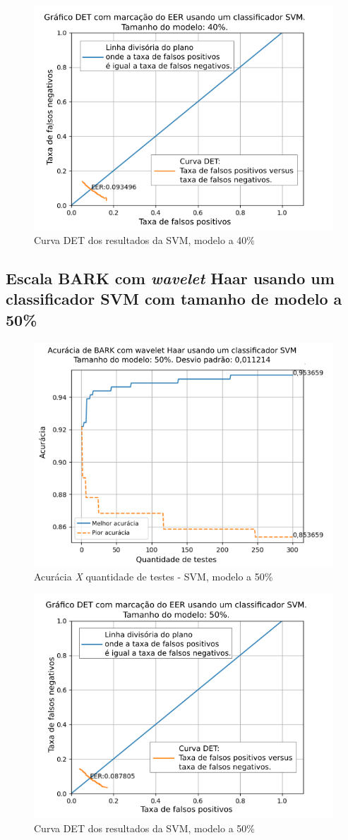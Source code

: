 			\begin{figure}[!h]
				\centering
				\includegraphics[width=.6\linewidth]{images/results/det/DET_SVM_40}
				\caption{Curva DET dos resultados da SVM, modelo a 40\%}
				\label{fig:detsvm40}
			\end{figure}

			\FloatBarrier

		\subsection{Escala BARK com \textit{wavelet} Haar usando um classificador SVM com tamanho de modelo a 50\%}

			

			\begin{figure}[!h]
				\centering
				\includegraphics[width=.6\linewidth]{images/results/confusionMatrices/classifier_SVM_50.png}
				\caption{Acurácia \textit{X} quantidade de testes - SVM, modelo a 50\%}
				\label{fig:classifiersvm50}
			\end{figure}
		
			\begin{figure}[!h]
				\centering
				\includegraphics[width=.6\linewidth]{images/results/det/DET_SVM_50}
				\caption{Curva DET dos resultados da SVM, modelo a 50\%}
				\label{fig:detsvm50}
			\end{figure}

